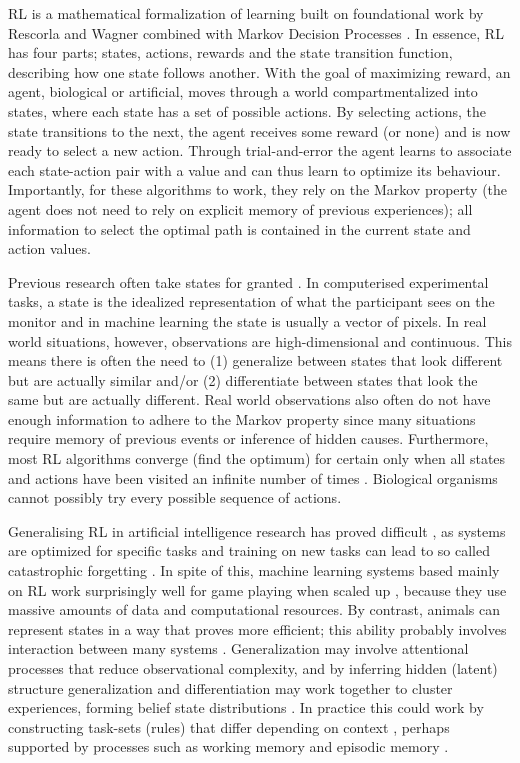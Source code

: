 \documentclass[10pt,letterpaper]{article}
\begin{document}
RL is a mathematical formalization of learning built on foundational work by Rescorla and Wagner \citeyear{Rescorla1972-na} combined with Markov Decision Processes \cite{Sutton2018-an}. In essence, RL has four parts; states, actions, rewards and the state transition function, describing how one state follows another. With the goal of maximizing reward, an agent, biological or artificial, moves through a world compartmentalized into states, where each state has a set of possible actions. By selecting actions, the state transitions to the next, the agent receives some reward (or none) and is now ready to select a new action. Through trial-and-error the agent learns to associate each state-action pair with a value and can thus learn to optimize its behaviour. Importantly, for these algorithms to work, they rely on the Markov property (the agent does not need to rely on explicit memory of previous experiences); all information to select the optimal path is contained in the current state and action values.

Previous research often take states for granted  \cite{Niv2019-xg}. In computerised experimental tasks, a state is the idealized representation of what the participant sees on the monitor and in machine learning the state is usually a vector of pixels. In real world situations, however, observations are high-dimensional and continuous. This means there is often the need to (1) generalize between states that look different but are actually similar and/or (2) differentiate between states that look the same but are actually different. Real world observations also often do not have enough information to adhere to the Markov property since many situations require memory of previous events or inference of hidden causes. Furthermore, most RL algorithms converge (find the optimum) for certain only when all states and actions have been visited an infinite number of times \cite{Sutton2018-an}. Biological organisms cannot possibly try every possible sequence of actions.

Generalising RL in artificial intelligence research has proved difficult \cite{Justesen2018-um}, as systems are optimized for specific tasks and training on new tasks can lead to so called catastrophic forgetting \cite{Kirkpatrick2017-vk}. In spite of this, machine learning systems based mainly on RL work surprisingly well for game playing when scaled up \cite{OpenAI2019-xb}, because they use massive amounts of data and computational resources. By contrast, animals can represent states in a way that proves more efficient; this ability probably involves interaction between many systems \cite{Collins2019-of, Niv2019-xg}. Generalization may involve attentional processes \cite{Niv2019-xg} that reduce observational complexity, and by inferring hidden (latent) structure \cite{Gershman2010-oc} generalization and differentiation may work together to cluster experiences, forming belief state distributions \cite{Schuck2018-ik,Starkweather2017-yj}. In practice this could work by constructing task-sets (rules) that differ depending on context \cite{Collins2013-cv}, perhaps supported by processes such as working memory \cite{Collins2018-ga} and episodic memory \cite{Gershman2017-ah}.
\end{document}
